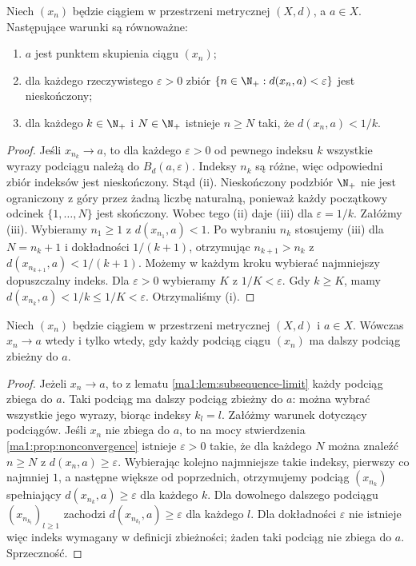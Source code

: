 \begin{twierdzenie}
\label{ma1:thm:cluster-criterion}
Niech $(x_n)$ będzie ciągiem w przestrzeni metrycznej $(X,d)$, a $a\in X$. Następujące warunki są równoważne:
\begin{enumerate}[label=(\roman*)]
\item $a$ jest punktem skupienia ciągu $(x_n)$;
\item dla każdego rzeczywistego $\varepsilon>0$ zbiór $\{n\in\N_+:d(x_n,a)<\varepsilon\}$ jest nieskończony;
\item dla każdego $k\in\N_+$ i $N\in\N_+$ istnieje $n\ge N$ taki, że $d(x_n,a)<1/k$.
\end{enumerate}
\end{twierdzenie}
\begin{proof}
Jeśli $x_{n_k}\to a$, to dla każdego $\varepsilon>0$ od pewnego indeksu $k$ wszystkie wyrazy podciągu należą do $B_d(a,\varepsilon)$. Indeksy $n_k$ są różne, więc odpowiedni zbiór indeksów jest nieskończony. Stąd (ii). Nieskończony podzbiór $\N_+$ nie jest ograniczony z góry przez żadną liczbę naturalną, ponieważ każdy początkowy odcinek $\{1,\ldots,N\}$ jest skończony. Wobec tego (ii) daje (iii) dla $\varepsilon=1/k$.
Załóżmy (iii). Wybieramy $n_1\ge1$ z $d(x_{n_1},a)<1$. Po wybraniu $n_k$ stosujemy (iii) dla $N=n_k+1$ i dokładności $1/(k+1)$, otrzymując $n_{k+1}>n_k$ z $d(x_{n_{k+1}},a)<1/(k+1)$. Możemy w każdym kroku wybierać najmniejszy dopuszczalny indeks. Dla $\varepsilon>0$ wybieramy $K$ z $1/K<\varepsilon$. Gdy $k\ge K$, mamy $d(x_{n_k},a)<1/k\le1/K<\varepsilon$. Otrzymaliśmy (i).
\end{proof}

\begin{twierdzenie}
\label{ma1:thm:subsequence-criterion}
Niech $(x_n)$ będzie ciągiem w przestrzeni metrycznej $(X,d)$ i $a\in X$. Wówczas $x_n\to a$ wtedy i tylko wtedy, gdy każdy podciąg ciągu $(x_n)$ ma dalszy podciąg zbieżny do $a$.
\end{twierdzenie}
\begin{proof}
Jeżeli $x_n\to a$, to z lematu \ref{ma1:lem:subsequence-limit} każdy podciąg zbiega do $a$. Taki podciąg ma dalszy podciąg zbieżny do $a$: można wybrać wszystkie jego wyrazy, biorąc indeksy $k_l=l$. Załóżmy warunek dotyczący podciągów. Jeśli $x_n$ nie zbiega do $a$, to na mocy stwierdzenia \ref{ma1:prop:nonconvergence} istnieje $\varepsilon>0$ takie, że dla każdego $N$ można znaleźć $n\ge N$ z $d(x_n,a)\ge\varepsilon$. Wybierając kolejno najmniejsze takie indeksy, pierwszy co najmniej $1$, a następne większe od poprzednich, otrzymujemy podciąg $(x_{n_k})$ spełniający $d(x_{n_k},a)\ge\varepsilon$ dla każdego $k$. Dla dowolnego dalszego podciągu $(x_{n_{k_l}})_{l\ge1}$ zachodzi $d(x_{n_{k_l}},a)\ge\varepsilon$ dla każdego $l$. Dla dokładności $\varepsilon$ nie istnieje więc indeks wymagany w definicji zbieżności; żaden taki podciąg nie zbiega do $a$. Sprzeczność.
\end{proof}

